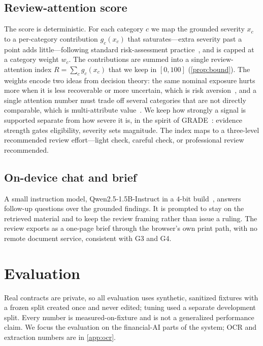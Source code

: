 \documentclass{article}
\theoremstyle{plain}
\begin{document}
\subsection{Review-attention score}
\label{sec:score}
The score is deterministic. For each category $c$ we map the grounded severity
$x_c$ to a per-category contribution $g_c(x_c)$ that saturates---extra severity
past a point adds little---following standard risk-assessment
practice~\citep{iso31000,iec60812}, and is capped at a category weight $w_c$. The
contributions are summed into a single review-attention index $R=\sum_c g_c(x_c)$
that we keep in $[0,100]$ (\cref{prop:bound}). The weights encode two ideas from
decision theory: the same nominal exposure hurts more when it is less recoverable
or more uncertain, which is risk aversion~\citep{pratt1964risk}, and a single
attention number must trade off several categories that are not directly
comparable, which is multi-attribute value~\citep{keeney1976decisions}. We keep
how strongly a signal is supported separate from how severe it is, in the spirit
of GRADE~\citep{guyatt2008grade}: evidence strength gates eligibility, severity
sets magnitude. The index maps to a three-level recommended review effort---light
check, careful check, or professional review recommended.

\subsection{On-device chat and brief}
A small instruction model, Qwen2.5-1.5B-Instruct in a $4$-bit
build~\citep{qwen2024report}, answers follow-up questions over the grounded
findings. It is prompted to stay on the retrieved material and to keep the review
framing rather than issue a ruling. The review exports as a one-page brief through
the browser's own print path, with no remote document service, consistent with G3
and G4.

\section{Evaluation}
\label{sec:eval}

Real contracts are private, so all evaluation uses synthetic, sanitized fixtures
with a frozen split created once and never edited; tuning used a separate
development split. Every number is measured-on-fixture and is not a generalized
performance claim. We focus the evaluation on the financial-AI parts of the
system; OCR and extraction numbers are in \cref{app:ocr}.
\end{document}
